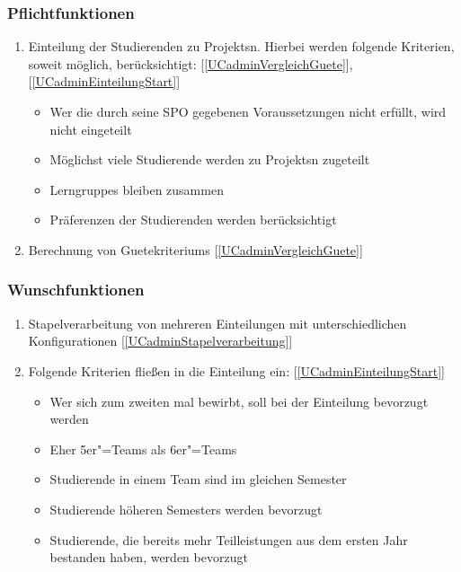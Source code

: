 \documentclass[parskip=full]{scrartcl}
\newcommand{\swtLabel}[1]{\textbf{/#1\arabic*0/}}
\newcommand{\testRef}[1]{[\ref{#1}]}
\begin{document}
\subsubsection{Pflichtfunktionen}
\begin{enumerate}[label=\swtLabel{FA}, resume]
  \item Einteilung der Studierenden zu \glspl{Projekt}n. Hierbei werden folgende
  Kriterien, soweit möglich, berücksichtigt: \testRef{UCadminVergleichGuete},
  \testRef{UCadminEinteilungStart}
  \begin{itemize}
    \item Wer die durch seine \gls{SPO} gegebenen Voraussetzungen nicht erfüllt,
    wird nicht eingeteilt \label{FAeinteilung}
    \item Möglichst viele Studierende werden zu \glspl{Projekt}n zugeteilt 
    \item \glspl{Lerngruppe} bleiben zusammen
    \item Präferenzen der Studierenden werden berücksichtigt 
 \end{itemize} \label{FAeinteilungMussKriterien} 
 \item Berechnung von \glspl{Guetekriterium} \label{FAguetekriterien}
 \testRef{UCadminVergleichGuete}
 
\end{enumerate}

 \subsubsection{Wunschfunktionen}
 
 \begin{enumerate}[label=\swtLabel{FA}, resume]
 \item Stapelverarbeitung von mehreren Einteilungen mit unterschiedlichen
 Konfigurationen \label{FAeinteilungStapel} \testRef{UCadminStapelverarbeitung}
 \item Folgende Kriterien fließen in die Einteilung ein:
 \testRef{UCadminEinteilungStart}
 \begin{itemize}
 	\item Wer sich zum zweiten mal bewirbt, soll bei der Einteilung bevorzugt werden
 	\item Eher 5er"=Teams als 6er"=Teams
 	\item Studierende in einem Team sind im gleichen Semester
 	\item Studierende höheren Semesters werden bevorzugt
 	\item Studierende, die bereits mehr Teilleistungen aus dem ersten Jahr
 	bestanden haben, werden bevorzugt
 \end{itemize} \label{FAeinteilungWunschKriterien}
 
\end{enumerate}
\end{document}

